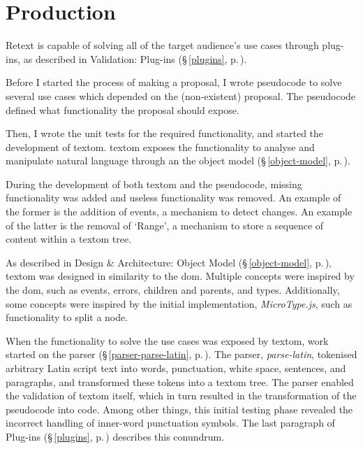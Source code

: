 
\begingroup
\let\clearpage\relax
\let\cleardoublepage\relax
\let\cleardoublepage\relax

\manualmark
{}

\chapter*{Production}\label{addendum-production}

Retext is capable of solving all of the target audience's use cases through
  plug-ins, as described in Validation: Plug-ins (§\,\ref{plugins},
  p.\,\pageref{plugins}).

Before I started the process of making a proposal, I wrote pseudocode to
  solve several use cases which depended on the (non-existent) proposal.
The pseudocode defined what functionality the proposal should expose.

Then, I wrote the unit tests for the required functionality, and started
  the development of \gls{textom}.
\gls{textom} exposes the functionality to analyse and manipulate natural
  language through an the object model (§\,\ref{object-model},
  p.\,\pageref{object-model}).

During the development of both \gls{textom} and the pseudocode, missing
  functionality was added and useless functionality was removed.
An example of the former is the addition of events, a mechanism to detect
  changes.
An example of the latter is the removal of `Range', a mechanism to store a
  sequence of content within a \gls{textom} tree.

As described in Design \& Architecture: Object Model (§\,\ref{object-model},
  p.\,\pageref{object-model}),
\gls{textom} was designed in similarity to the \gls{dom}.
Multiple concepts were inspired by the \gls{dom}, such as events, errors,
  children and parents, and types.
Additionally, some concepts were inspired by the initial implementation,
  \emph{MicroType.js}, such as functionality to split a node.

When the functionality to solve the use cases was exposed by \gls{textom},
  work started on the parser (§\,\ref{parser-parse-latin},
  p.\,\pageref{parser-parse-latin}).
The parser, \emph{parse-latin}, tokenised arbitrary Latin script text into
  words, punctuation, white space, sentences, and paragraphs, and transformed
  these tokens into a \gls{textom} tree.
The parser enabled the validation of \gls{textom} itself, which in turn
  resulted in the transformation of the pseudocode into code.
Among other things, this initial testing phase revealed the incorrect
  handling of inner-word punctuation symbols.
The last paragraph of Plug-ins (§\,\ref{plugins}, p.\,\pageref{plugins})
  describes this conundrum.

